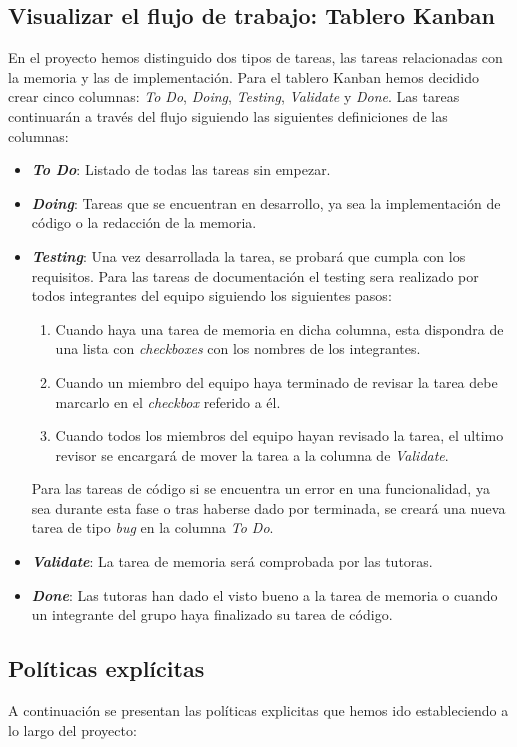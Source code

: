 \subsection{Visualizar el flujo de trabajo: Tablero Kanban}
En el proyecto hemos distinguido dos tipos de tareas, las tareas relacionadas con la memoria y las de implementación. Para el tablero Kanban hemos decidido crear cinco columnas: \textit{To Do}, \textit{Doing}, \textit{Testing}, \textit{Validate} y \textit{Done}.  Las tareas continuarán a través del flujo siguiendo las siguientes definiciones de las columnas:
\begin{itemize}
    \item \textbf{\textit{To Do}}: Listado de todas las tareas sin empezar.
    \item \textbf{\textit{Doing}}: Tareas que se encuentran en desarrollo, ya sea la implementación de código o la redacción de la memoria.
    \item \textbf{\textit{Testing}}: Una vez desarrollada la tarea, se probará que cumpla con los requisitos.
          Para las tareas de documentación el testing sera realizado por todos integrantes del equipo siguiendo los siguientes pasos:
          \begin{enumerate}
              \item Cuando haya una tarea de memoria en dicha columna, esta dispondra de una lista con \textit{checkboxes} con los nombres de los integrantes.
              \item Cuando un miembro del equipo haya terminado de revisar la tarea debe marcarlo en el \textit{checkbox} referido a él.
              \item Cuando todos los miembros del equipo hayan revisado la tarea, el ultimo revisor se encargará de mover la tarea a la columna de \textit{Validate}.
          \end{enumerate}
          Para las tareas de código si se encuentra un error en una funcionalidad, ya sea durante esta fase o tras haberse dado por terminada, se creará una nueva tarea de tipo \textit{bug} en la columna \textit{To Do}.
    \item \textbf{\textit{Validate}}: La tarea de memoria será comprobada por las tutoras.
    \item \textbf{\textit{Done}}: Las tutoras han dado el visto bueno a la tarea de memoria o cuando un integrante del grupo haya finalizado su tarea de código.
\end{itemize}

\subsection{Políticas explícitas}
A continuación se presentan las políticas explicitas que hemos ido estableciendo a lo largo del proyecto:

